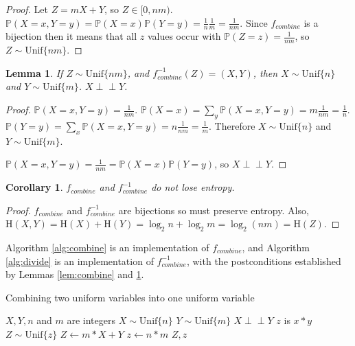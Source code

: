 \documentclass[12pt]{article}
\newtheorem{lemma}{Lemma}
\newtheorem{corollary}{Corollary}
\newcommand{\indep}{\perp\!\!\!\perp}
\newcommand{\unif}[1]{\mathrm{Unif}\{#1\}}
\newcommand{\entropy}[1]{\mathrm{H}(#1)}
\newcommand{\prob}[1]{\mathbb{P}(#1)}
\begin{document}
\begin{proof}
    Let $Z = mX+Y$, so $Z \in [0,nm)$. $\prob{X=x,Y=y} = \prob{X=x}\mathbb{P}(Y=y) = \frac{1}{n}\frac{1}{m} = \frac{1}{nm}$. Since $f_{combine}$ is a bijection then it means that all $z$ values occur with $\prob{Z=z} = \frac{1}{nm}$, so $Z \sim \unif{nm}$.
    
\end{proof}

\begin{lemma}
    If $Z \sim \unif{nm}$, and $f^{-1}_{combine}(Z) = (X,Y)$, then $X \sim \unif{n}$ and $Y \sim \unif{m}$. $X \indep Y$.
    \label{lem:divide-postconditions}
\end{lemma}

\begin{proof}
    $\prob{X=x,Y=y} = \frac{1}{nm}$. $\prob{X=x} = \sum_{y}\prob{X=x,Y=y} = m\frac{1}{nm} = \frac{1}{n}$. $\prob{Y=y} = \sum_{x}\prob{X=x,Y=y} = n\frac{1}{nm} = \frac{1}{m}$. Therefore $X\sim \unif{n}$ and $Y\sim \unif{m}$.

    $\mathbb{P}(X=x,Y=y) = \frac{1}{nm} = \mathbb{P}(X=x)\mathbb{P}(Y=y)$, so $X \indep Y$.
\end{proof}

\begin{corollary}
    $f_{combine}$ and $f^{-1}_{combine}$ do not lose entropy.
    \label{cor:combine-entropy}
\end{corollary}

\begin{proof}$f_{combine}$ and $f^{-1}_{combine}$ are bijections so must preserve entropy. Also, $\entropy{X,Y} = \entropy{X} + \entropy{Y} = \log_2{n} + \log_2{m} = \log_2(nm) = \entropy{Z}$.
\end{proof}

Algorithm \ref{alg:combine} is an implementation of $f_{combine}$, and Algorithm \ref{alg:divide} is an implementation of $f^{-1}_{combine}$, with the postconditions established by Lemmas \ref{lem:combine} and \ref{lem:divide-postconditions}.

\begin{algorithm}
\caption{Combining two uniform variables into one uniform variable}
\label{alg:combine}
\begin{algorithmic}[1]
    \Require $X, Y, n$ and $m$ are integers
    \Require $X \sim \unif{n}$
    \Require $Y \sim \unif{m}$
    \Require $X \indep Y$
    \Ensure $z$ is $x * y$
    \Ensure $Z \sim \unif{z}$
  \State $Z \gets m * X + Y$
  \State $z \gets n * m$
  \State \Return $Z, z$
\EndProcedure
\end{algorithmic}
\end{algorithm}
\end{document}
